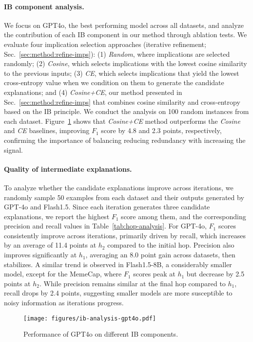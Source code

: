 \paragraph{IB component analysis.}
We focus on GPT4o, the best performing model across all datasets, and analyze the contribution of each IB component in our method through ablation tests. We evaluate four implication selection approaches (iterative refinement; Sec.~\ref{sec:method:refine-imps}): (1) \textit{Random}, where implications are selected randomly; (2) \textit{Cosine}, which selects implications with the lowest cosine similarity to the previous inputs; (3) \textit{CE}, which selects implications that yield the lowest cross-entropy value when we condition on them to generate the candidate explanations; and (4) \textit{Cosine+CE}, our method presented in Sec.~\ref{sec:method:refine-imps} that combines cosine similarity and cross-entropy based on the IB principle. We conduct the analysis on 100 random instances from each dataset. Figure~\ref{fig:ib-performance} shows that \textit{Cosine+CE} method outperforms the \textit{Cosine} and \textit{CE} baselines, improving $F_1$ score by 4.8 and 2.3 points, respectively, confirming the importance of balancing reducing redundancy with increasing the signal. 

\paragraph{Quality of intermediate explanations.} 
To analyze whether the candidate explanations improve across iterations, we randomly sample 50 examples from each dataset and their outputs generated by GPT-4o and Flash1.5. Since each iteration generates three candidate explanations, we report the highest $F_1$ score among them, and the corresponding precision and recall values in Table~\ref{tab:hop-analysis}. For GPT-4o, $F_1$ scores consistently improve across iterations, primarily driven by recall, which increases by an average of 11.4 points at $h_2$ compared to the initial hop. Precision also improves significantly at $h_1$, averaging an 8.0 point gain across datasets, then stabilizes.
A similar trend is observed in Flash1.5-8B, a considerably smaller model, except for the MemeCap, where $F_1$ scores peak at $h_1$ but decrease by 2.5 points at $h_2$. While precision remains similar at the final hop compared to $h_1$, recall drops by 2.4 points, suggesting smaller models are more susceptible to noisy information as iterations progress.

\begin{figure}[t]
\small
\centering
  \texttt{[image: figures/ib-analysis-gpt4o.pdf]}
  \caption {Performance of GPT4o on different IB components.}
  \label{fig:ib-performance}
\end{figure}


